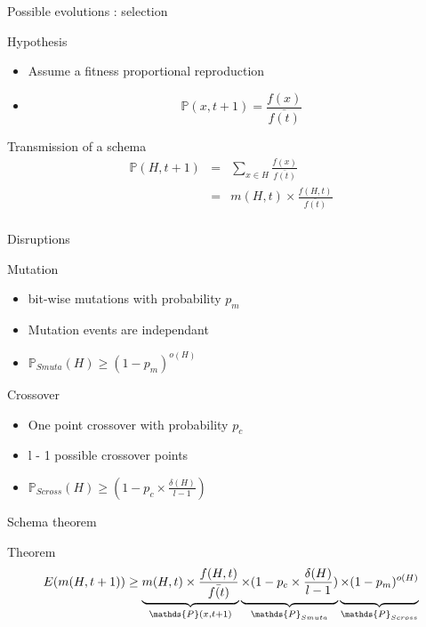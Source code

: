 \begin{frame}{Possible evolutions : selection}
  \begin{block}{Hypothesis}
    \begin{itemize}
    \item Assume a fitness proportional reproduction
    \item $$\mathds{P}(x,t+1) = \frac{f(x)}{\bar{f(t)}}$$
    \end{itemize}
  \end{block}

  \begin{block}{Transmission of a schema}
    $$\begin{array}{lll}
      \mathds{P}(H,t+1) & = & \sum\limits_{x \in H} \frac{f(x)}{\bar{f(t)}}\\
      & = & m(H,t) \times \frac{f(H,t)}{\bar{f(t)}}\\
    \end{array}$$
  \end{block}
\end{frame}

\begin{frame}{Disruptions}
  \begin{block}{Mutation}
    \begin{itemize}
    \item bit-wise mutations with probability $p_m$
    \item Mutation events are independant
    \item $\mathds{P}_{Smuta}(H) \geq (1 - p_m)^{o(H)}$
    \end{itemize}
  \end{block}

  \begin{block}{Crossover}
    \begin{itemize}
      \item One point crossover with probability $p_c$
      \item l - 1 possible crossover points
      \item $\mathds{P}_{Scross}(H) \geq (1 - p_c \times \frac{\delta(H)}{l - 1})$
    \end{itemize}
  \end{block}
\end{frame}

\begin{frame}{Schema theorem}
  \begin{block}{Theorem}
    $$E(m(H,t+1)) \geq \underbrace{m(H,t) \times \frac{f(H,t)}{\bar{f(t)}}}_{\mathds{P}(x,t+1)}
    \underbrace{\times (1 - p_c \times \frac{\delta(H)}{l-1})\vphantom{\frac{f(H,t)}{\bar{f(t)}}}}_{\mathds{P}_{Smuta}}
    \underbrace{\times (1 - p_m)^{o(H)}\vphantom{\frac{f(H,t)}{\bar{f(t)}}}}_{\mathds{P}_{Scross}}$$
  \end{block}
\end{frame}

